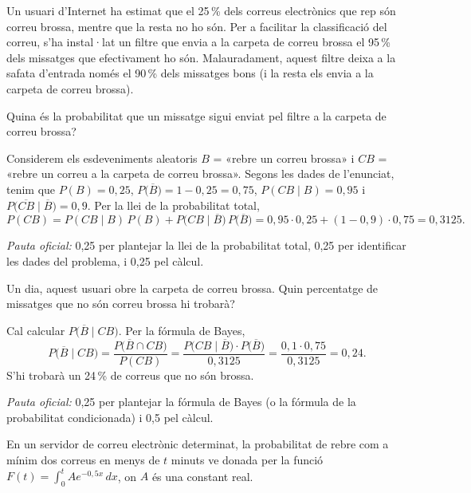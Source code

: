 Un usuari d'Internet ha estimat que el 25\,\% dels correus electrònics que rep són correu brossa, mentre que la
resta no ho són. Per a facilitar la classificació del correu, s'ha instal·lat un filtre que envia a la carpeta
de correu brossa el 95\,\% dels missatges que efectivament ho són. Malauradament, aquest filtre deixa a la
safata d'entrada només el 90\,\% dels missatges bons (i la resta els envia a la carpeta de correu brossa).

\begin{apartats}

Quina és la probabilitat que un missatge sigui enviat pel filtre a la carpeta de correu brossa?

\begin{solucio}
Considerem els esdeveniments aleatoris $B$ = «rebre un correu brossa» i $CB$ = «rebre un correu a la carpeta
de correu brossa». Segons les dades de l'enunciat, tenim que $P(B)=0{,}25$,
$P\bigl(\overline{B}\bigr)=1-0{,}25=0{,}75$, $P(CB\mid B)=0{,}95$ i $P\bigl(\overline{CB}\mid\overline{B}\bigr)=0{,}9$.
Per la llei de la probabilitat total,
\[
P(CB)=P(CB\mid B)\,P(B)+P\bigl(CB\mid\overline{B}\bigr)\,P\bigl(\overline{B}\bigr)=0{,}95\cdot0{,}25+(1-0{,}9)\cdot0{,}75
=0{,}3125 .
\]

\textit{Pauta oficial:} 0,25 per plantejar la llei de la probabilitat total, 0,25 per identificar les dades
del problema, i 0,25 pel càlcul.
\end{solucio}

Un dia, aquest usuari obre la carpeta de correu brossa. Quin percentatge de missatges que no són correu
brossa hi trobarà?

\begin{solucio}
Cal calcular $P\bigl(\overline{B}\mid CB\bigr)$. Per la fórmula de Bayes,
\[
P\bigl(\overline{B}\mid CB\bigr)=\frac{P\bigl(\overline{B}\cap CB\bigr)}{P(CB)}
=\frac{P\bigl(CB\mid\overline{B}\bigr)\cdot P\bigl(\overline{B}\bigr)}{0{,}3125}=\frac{0{,}1\cdot0{,}75}{0{,}3125}=0{,}24 .
\]
S'hi trobarà un 24\,\% de correus que no són brossa.

\textit{Pauta oficial:} 0,25 per plantejar la fórmula de Bayes (o la fórmula de la probabilitat
condicionada) i 0,5 pel càlcul.
\end{solucio}

En un servidor de correu electrònic determinat, la probabilitat de rebre com a mínim dos correus en menys de
$t$ minuts ve donada per la funció $F(t)=\int_0^tAe^{-0{,}5x}\,dx$, on $A$ és una constant real.


\end{apartats}
